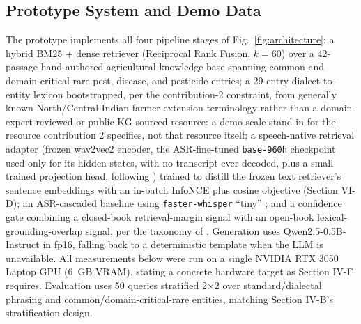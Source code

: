 \documentclass[conference]{IEEEtran}
\begin{document}
\subsection{Prototype System and Demo Data}
The prototype implements all four pipeline stages of Fig.~\ref{fig:architecture}: a hybrid BM25 + dense retriever (Reciprocal Rank Fusion, $k=60$) over a 42-passage hand-authored agricultural knowledge base spanning common and domain-critical-rare pest, disease, and pesticide entries; a 29-entry dialect-to-entity lexicon bootstrapped, per the contribution-2 constraint, from generally known North/Central-Indian farmer-extension terminology rather than a domain-expert-reviewed or public-KG-sourced resource: a demo-scale stand-in for the resource contribution 2 specifies, not that resource itself; a speech-native retrieval adapter (frozen wav2vec2 \cite{baevski2020wav2vec} encoder, the ASR-fine-tuned \texttt{base-960h} checkpoint used only for its hidden states, with no transcript ever decoded, plus a small trained projection head, following \cite{min2025speechrag,google2025s2r}) trained to distill the frozen text retriever's sentence embeddings with an in-batch InfoNCE plus cosine objective (Section VI-D); an ASR-cascaded baseline using \texttt{faster-whisper} ``tiny'' \cite{radford2023whisper}; and a confidence gate combining a closed-book retrieval-margin signal with an open-book lexical-grounding-overlap signal, per the taxonomy of \cite{dependablerag2026}. Generation uses Qwen2.5-0.5B-Instruct in fp16, falling back to a deterministic template when the LLM is unavailable. All measurements below were run on a single NVIDIA RTX 3050 Laptop GPU (6~GB VRAM), stating a concrete hardware target as Section IV-F requires. Evaluation uses 50 queries stratified 2$\times$2 over standard/dialectal phrasing and common/domain-critical-rare entities, matching Section IV-B's stratification design.
\end{document}
